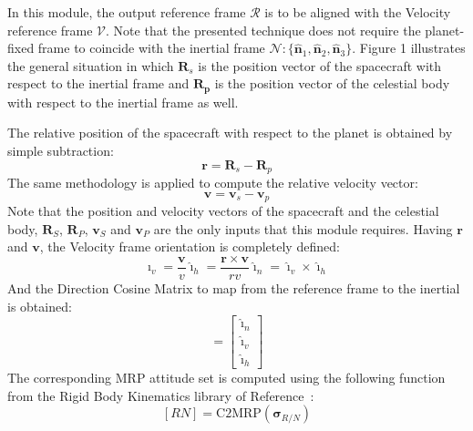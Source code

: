 \documentclass[]{AVSSimReportMemo}
\begin{document}
In this module, the output reference frame $\mathcal{R}$ is to be aligned with the Velocity reference frame $\mathcal{V}$. Note that the presented technique does not require the planet-fixed  frame to coincide with the inertial frame $\mathcal{N}:\{ \hat{\bm n}_{1}, \hat{\bm n}_{2}, \hat{\bm n}_{3} \}$. Figure 1 illustrates the general situation in which $\bm{R}_{s}$ is the position vector of the spacecraft with respect to the inertial frame and $\bm{R_{p}}$ is the position vector of the  celestial body with respect to the inertial frame as well.

The relative position of the spacecraft with respect to the planet is obtained by simple subtraction:
\begin{equation}
  \label{eq:r}
  \bm r = \bm R_{s} -  \bm R_{p}
\end{equation}
The same methodology is applied to compute the relative velocity vector:
\begin{equation}
  \label{eq:v}
  \bm v = \bm v_{s} -  \bm v_{p}
\end{equation}
Note that the position and velocity vectors of the spacecraft and the celestial body, $\bm{R}_S$,  $\bm{R}_P$,  $\bm{v}_S$ and  $\bm{v}_P$ are the only inputs that this module requires. Having $\bm r$ and $\bm v$, the Velocity frame orientation is completely defined:
\begin{subequations}
  \begin{equation}
  \hat{\bm\imath}_{v} = \frac{\bm v}{v} 
  \end{equation}
  \begin{equation}
  \hat{\bm\imath}_{h} = \frac{\bm{r}\times{\bm{v}}}{rv}
  \end{equation}
  \begin{equation}
  \hat{\bm\imath}_{n} = \hat{\bm\imath}_{v} \times \hat{\bm\imath}_{h}
  \end{equation}
\end{subequations}
And the Direction Cosine Matrix to map from the reference frame to the inertial is obtained:
\begin{equation}
	[RN] =  \begin{bmatrix}
       		\hat{\bm\imath}_{n} \\
		\hat{\bm\imath}_{v} \\ 
		\hat{\bm\imath}_{h}
      \end{bmatrix}
\end{equation}
The corresponding MRP attitude set is computed using the following function from the Rigid Body Kinematics library of Reference~:
$$ [RN] = \textrm{C2MRP}(\bm\sigma_{R/N})$$
\end{document}
